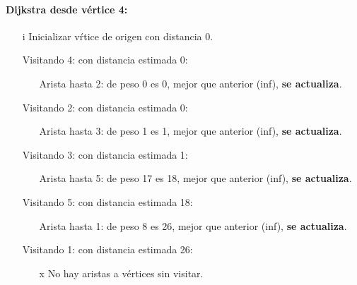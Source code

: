 \documentclass[../tp2_grupo404.tex]{subfiles}
\begin{document}
\paragraph{Dijkstra desde v\'ertice 4:}\par
\begin{enumerate}
\item[i] Inicializar v\'rtice de origen con distancia 0.
 \item[Visitando 4:] con distancia estimada 0:
\begin{enumerate}
   \item[Arista hasta 2:] de peso 0 es 0, mejor que anterior (inf), \textbf{se actualiza}.
\end{enumerate}

 \item[Visitando 2:] con distancia estimada 0:
\begin{enumerate}
   \item[Arista hasta 3:] de peso 1 es 1, mejor que anterior (inf), \textbf{se actualiza}.
\end{enumerate}

 \item[Visitando 3:] con distancia estimada 1:
\begin{enumerate}
   \item[Arista hasta 5:] de peso 17 es 18, mejor que anterior (inf), \textbf{se actualiza}.
\end{enumerate}

 \item[Visitando 5:] con distancia estimada 18:
\begin{enumerate}
   \item[Arista hasta 1:] de peso 8 es 26, mejor que anterior (inf), \textbf{se actualiza}.
\end{enumerate}

 \item[Visitando 1:] con distancia estimada 26:
\begin{enumerate}
   \item[x] No hay aristas a v\'ertices sin visitar.
\end{enumerate}

\end{enumerate}
\end{document}
